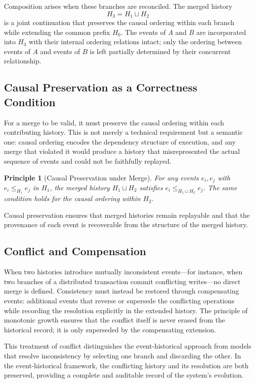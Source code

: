 \documentclass[12pt]{article}
\newtheorem{principle}{Principle}
\begin{document}
Composition arises when these branches are reconciled. The merged history
\[
H_3 = H_1 \sqcup H_2
\]
is a joint continuation that preserves the causal ordering within each branch while extending the common prefix $H_0$. The events of $A$ and $B$ are incorporated into $H_3$ with their internal ordering relations intact; only the ordering between events of $A$ and events of $B$ is left partially determined by their concurrent relationship.

\subsection{Causal Preservation as a Correctness Condition}

For a merge to be valid, it must preserve the causal ordering within each contributing history. This is not merely a technical requirement but a semantic one: causal ordering encodes the dependency structure of execution, and any merge that violated it would produce a history that misrepresented the actual sequence of events and could not be faithfully replayed.

\begin{principle}[Causal Preservation under Merge]
For any events $e_i, e_j$ with $e_i \leq_{H_1} e_j$ in $H_1$, the merged history $H_1 \sqcup H_2$ satisfies $e_i \leq_{H_1 \sqcup H_2} e_j$. The same condition holds for the causal ordering within $H_2$.
\end{principle}

Causal preservation ensures that merged histories remain replayable and that the provenance of each event is recoverable from the structure of the merged history.

\subsection{Conflict and Compensation}

When two histories introduce mutually inconsistent events---for instance, when two branches of a distributed transaction commit conflicting writes---no direct merge is defined. Consistency must instead be restored through compensating events: additional events that reverse or supersede the conflicting operations while recording the resolution explicitly in the extended history. The principle of monotonic growth ensures that the conflict itself is never erased from the historical record; it is only superseded by the compensating extension.

This treatment of conflict distinguishes the event-historical approach from models that resolve inconsistency by selecting one branch and discarding the other. In the event-historical framework, the conflicting history and its resolution are both preserved, providing a complete and auditable record of the system's evolution.
\end{document}
